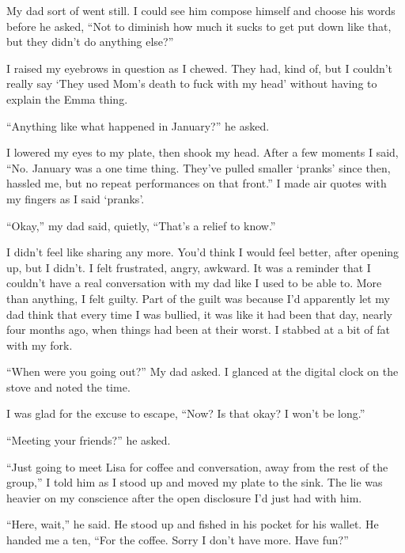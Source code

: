 My dad sort of went still.  I could see him compose himself and choose his words before he asked, ``Not to diminish how much it sucks to get put down like that, but they didn't do anything else?''



I raised my eyebrows in question as I chewed.  They had, kind of, but I couldn't really say `They used Mom's death to fuck with my head' without having to explain the Emma thing.



``Anything like what happened in January?'' he asked.



I lowered my eyes to my plate, then shook my head.  After a few moments I said, ``No.  January was a one time thing.  They've pulled smaller `pranks' since then, hassled me, but no repeat performances on that front.''  I made air quotes with my fingers as I said `pranks'.



``Okay,'' my dad said, quietly, ``That's a relief to know.''



I didn't feel like sharing any more.  You'd think I would feel better, after opening up, but I didn't.  I felt frustrated, angry, awkward.  It was a reminder that I couldn't have a real conversation with my dad like I used to be able to.  More than anything, I felt guilty.  Part of the guilt was because I'd apparently let my dad think that every time I was bullied, it was like it had been that day, nearly four months ago, when things had been at their worst.  I stabbed at a bit of fat with my fork.



``When were you going out?'' My dad asked.  I glanced at the digital clock on the stove and noted the time.



I was glad for the excuse to escape, ``Now?  Is that okay?  I won't be long.''



``Meeting your friends?'' he asked.



``Just going to meet Lisa for coffee and conversation, away from the rest of the group,'' I told him as I stood up and moved my plate to the sink.  The lie was heavier on my conscience after the open disclosure I'd just had with him.



``Here, wait,'' he said.  He stood up and fished in his pocket for his wallet.  He handed me a ten, ``For the coffee.  Sorry I don't have more.  Have fun?''



